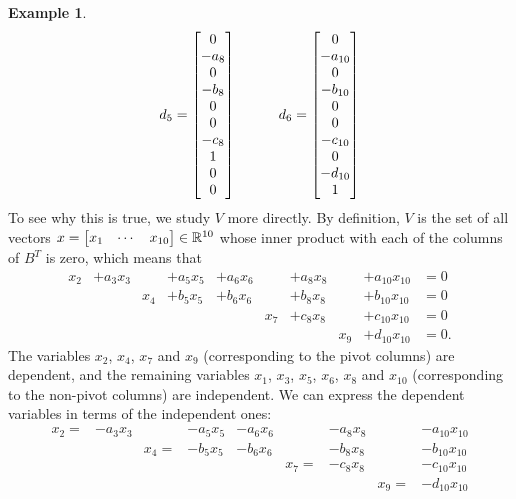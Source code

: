 \documentclass[reqno]{amsart}
\theoremstyle{definition}
\newtheorem{example}[theorem]{Example}
\begin{document}
\begin{example}
\[     d_5 = \left[\begin{matrix} 0 \\ -a_8    \\  0  \\ -b_8    \\  0  \\  0  \\ -c_8    \\  1  \\ 0       \\  0  \end{matrix}\right] \hspace{3em}
     d_6 = \left[\begin{matrix} 0 \\ -a_{10} \\  0  \\ -b_{10} \\  0  \\  0  \\ -c_{10} \\  0  \\ -d_{10} \\  1  \end{matrix}\right]
 \]
 To see why this is true, we study $V$ more directly.  By definition,
 $V$ is the set of all vectors
 $x=\left[\begin{matrix} x_1&\cdots&x_{10}\end{matrix}\right]\in{\mathbb{R}}^{10}$ whose inner product with
 each of the columns of $B^T$ is zero, which means that
 \[ \begin{array}{cccccccccc}
  x_2 & +a_3x_3 &     & + a_5x_5 & + a_6x_6 &     & + a_8x_8 &     & + a_{10}x_{10} & = 0 \\
      &         & x_4 & + b_5x_5 & + b_6x_6 &     & + b_8x_8 &     & + b_{10}x_{10} & = 0 \\
      &         &     &          &          & x_7 & + c_8x_8 &     & + c_{10}x_{10} & = 0 \\
      &         &     &          &          &     &          & x_9 & + d_{10}x_{10} & = 0.
 \end{array}\]
 The variables $x_2$, $x_4$, $x_7$ and $x_9$ (corresponding to the
 pivot columns) are dependent, and the remaining variables $x_1$,
 $x_3$, $x_5$, $x_6$, $x_8$ and $x_{10}$ (corresponding to the
 non-pivot columns) are independent.  We can express the dependent
 variables in terms of the independent ones:
 \[ \begin{array}{ccccccccc}
  x_2= & -a_3x_3 &      & - a_5x_5 & - a_6x_6 &      & - a_8x_8 &      & - a_{10}x_{10} \\
       &         & x_4= & - b_5x_5 & - b_6x_6 &      & - b_8x_8 &      & - b_{10}x_{10} \\
       &         &      &          &          & x_7= & - c_8x_8 &      & - c_{10}x_{10} \\
       &         &      &          &          &      &          & x_9= & - d_{10}x_{10}

\end{array}\]
\end{example}
\end{document}
